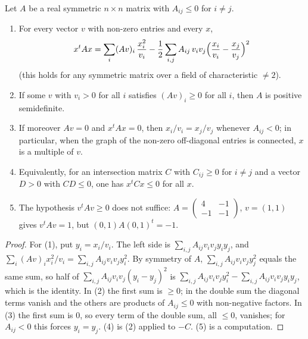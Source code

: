 \begin{encadre}
\begin{theoreme}\label{thm:quillen-1982-7}
Let $A$ be a real symmetric $n \times n$ matrix with $A_{ij} \le 0$ for $i \ne j$.
\begin{enumerate}
\item For every vector $v$ with non-zero entries and every $x$,
\[
  x^{t}Ax = \sum_i (Av)_i\,\frac{x_i^2}{v_i} - \frac12 \sum_{i,j} A_{ij}\,v_iv_j\Bigl(\frac{x_i}{v_i} - \frac{x_j}{v_j}\Bigr)^2
\]
(this holds for any symmetric matrix over a field of characteristic $\ne 2$).
\item If some $v$ with $v_i > 0$ for all $i$ satisfies $(Av)_i \ge 0$ for all $i$, then $A$ is positive semidefinite.
\item If moreover $Av = 0$ and $x^{t}Ax = 0$, then $x_i/v_i = x_j/v_j$ whenever $A_{ij} < 0$; in particular, when the graph of the non-zero off-diagonal entries is connected, $x$ is a multiple of $v$.
\item Equivalently, for an intersection matrix $C$ with $C_{ij} \ge 0$ for $i \ne j$ and a vector $D > 0$ with $CD \le 0$, one has $x^{t}Cx \le 0$ for all $x$.
\item The hypothesis $v^{t}Av \ge 0$ does not suffice: $A = \begin{pmatrix} 4 & -1 \\ -1 & -1 \end{pmatrix}$, $v = (1, 1)$ gives $v^{t}Av = 1$, but $(0, 1)A(0, 1)^{t} = -1$.
\end{enumerate}
\end{theoreme}
\end{encadre}

\begin{proof}
For (1), put $y_i = x_i/v_i$. The left side is $\sum_{i,j} A_{ij} v_iv_j y_iy_j$, and $\sum_i (Av)_i x_i^2/v_i = \sum_{i,j} A_{ij} v_iv_j y_i^2$. By symmetry of $A$, $\sum_{i,j} A_{ij} v_iv_j y_j^2$ equals the same sum, so half of $\sum_{i,j} A_{ij} v_iv_j (y_i - y_j)^2$ is $\sum_{i,j} A_{ij}v_iv_j y_i^2 - \sum_{i,j} A_{ij} v_iv_j y_iy_j$, which is the identity. In (2) the first sum is $\ge 0$; in the double sum the diagonal terms vanish and the others are products of $A_{ij} \le 0$ with non-negative factors. In (3) the first sum is $0$, so every term of the double sum, all $\le 0$, vanishes; for $A_{ij} < 0$ this forces $y_i = y_j$. (4) is (2) applied to $-C$. (5) is a computation.
\end{proof}

